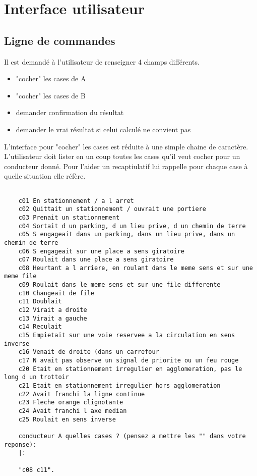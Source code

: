 
\chapter{Interface utilisateur}

\section{Ligne de commandes}

Il est demandé à l'utilisateur de renseigner 4 champs différents.
\begin{itemize}
\item "cocher" les cases de A
\item "cocher" les cases de B
\item demander confirmation du résultat
\item demander le vrai résultat si celui calculé ne convient pas
\end{itemize}

\vspace*{7mm}

L'interface pour "cocher" les cases est réduite à une simple chaine de caractère. L'utilisateur doit lister en un coup toutes les cases qu'il veut cocher pour un conducteur donné. Pour l'aider un recaptiulatif lui rappelle pour chaque case à quelle situation elle réfère.
\newline


\begin{lstlisting}[frame=single]

    c01 En stationnement / a l arret
    c02 Quittait un stationnement / ouvrait une portiere
    c03 Prenait un stationnement
    c04 Sortait d un parking, d un lieu prive, d un chemin de terre
    c05 S engageait dans un parking, dans un lieu prive, dans un chemin de terre
    c06 S engageait sur une place a sens giratoire
    c07 Roulait dans une place a sens giratoire
    c08 Heurtant a l arriere, en roulant dans le meme sens et sur une meme file
    c09 Roulait dans le meme sens et sur une file differente
    c10 Changeait de file
    c11 Doublait
    c12 Virait a droite
    c13 Virait a gauche
    c14 Reculait
    c15 Empietait sur une voie reservee a la circulation en sens inverse
    c16 Venait de droite (dans un carrefour
    c17 N avait pas observe un signal de priorite ou un feu rouge
    c20 Etait en stationnement irregulier en agglomeration, pas le long d un trottoir
    c21 Etait en stationnement irregulier hors agglomeration
    c22 Avait franchi la ligne continue
    c23 Fleche orange clignotante
    c24 Avait franchi l axe median
    c25 Roulait en sens inverse

    conducteur A quelles cases ? (pensez a mettre les "" dans votre reponse):
    |: 

    "c08 c11".
\end{lstlisting}

